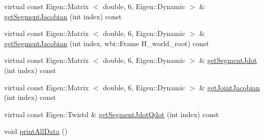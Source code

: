 \begin{DoxyCompactItemize}
virtual const \-Eigen\-::\-Matrix\*
$<$ double, 6, \-Eigen\-::\-Dynamic $>$ \& \hyperlink{classocra__icub_1_1OcraWbiModel_a5f0aa99b6b6e85b465ad3a5238caeb9d}{get\-Segment\-Jacobian} (int index) const 
\item 
virtual const \-Eigen\-::\-Matrix\*
$<$ double, 6, \-Eigen\-::\-Dynamic $>$ \& \hyperlink{classocra__icub_1_1OcraWbiModel_a5c556d66e590314fa6c44ceb8658d540}{get\-Segment\-Jacobian} (int index, wbi\-::\-Frame \-H\-\_\-world\-\_\-root) const 
\item 
virtual const \-Eigen\-::\-Matrix\*
$<$ double, 6, \-Eigen\-::\-Dynamic $>$ \& \hyperlink{classocra__icub_1_1OcraWbiModel_a0c391aaf9a10840346b35952e89e32fc}{get\-Segment\-Jdot} (int index) const 
\item 
virtual const \-Eigen\-::\-Matrix\*
$<$ double, 6, \-Eigen\-::\-Dynamic $>$ \& \hyperlink{classocra__icub_1_1OcraWbiModel_a4dd0a4cd9f8d710c64e67c0336169321}{get\-Joint\-Jacobian} (int index) const 
\item 
virtual const \-Eigen\-::\-Twistd \& \hyperlink{classocra__icub_1_1OcraWbiModel_a3261757fab0ab980f8b92748bf5d350e}{get\-Segment\-Jdot\-Qdot} (int index) const 
\item 
void \hyperlink{classocra__icub_1_1OcraWbiModel_a309b3554c4eefda46c05b766476f40fb}{print\-All\-Data} ()
\end{DoxyCompactItemize}
